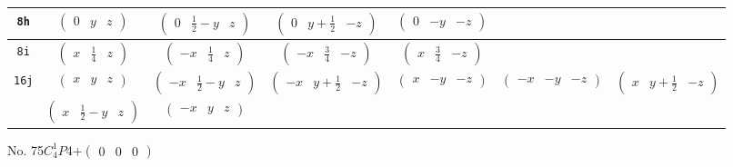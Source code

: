 \documentclass[fleqn,9pt,landscape]{jsarticle}
\begin{document}
\begin{center}
\begin{longtable}{ccccccc}
{\tt 8h} & $ \begin{pmatrix} 0 & y & z \end{pmatrix} $ & $ \begin{pmatrix} 0 & \frac{1}{2} - y & z \end{pmatrix} $ & $ \begin{pmatrix} 0 & y + \frac{1}{2} & - z \end{pmatrix} $ & $ \begin{pmatrix} 0 & - y & - z \end{pmatrix} $ & $  $ & $  $ \\ \hline
{\tt 8i} & $ \begin{pmatrix} x & \frac{1}{4} & z \end{pmatrix} $ & $ \begin{pmatrix} - x & \frac{1}{4} & z \end{pmatrix} $ & $ \begin{pmatrix} - x & \frac{3}{4} & - z \end{pmatrix} $ & $ \begin{pmatrix} x & \frac{3}{4} & - z \end{pmatrix} $ & $  $ & $  $ \\ \hline
{\tt 16j} & $ \begin{pmatrix} x & y & z \end{pmatrix} $ & $ \begin{pmatrix} - x & \frac{1}{2} - y & z \end{pmatrix} $ & $ \begin{pmatrix} - x & y + \frac{1}{2} & - z \end{pmatrix} $ & $ \begin{pmatrix} x & - y & - z \end{pmatrix} $ & $ \begin{pmatrix} - x & - y & - z \end{pmatrix} $ & $ \begin{pmatrix} x & y + \frac{1}{2} & - z \end{pmatrix} $ \\
& $ \begin{pmatrix} x & \frac{1}{2} - y & z \end{pmatrix} $ & $ \begin{pmatrix} - x & y & z \end{pmatrix} $ & $  $ & $  $ & $  $ & $  $ \\
\end{longtable}
\end{center}
\newpage
No. 75\quad$C_{4}^{1}$\quad$P4$\quad[ tetragonal ]\quad$+\begin{pmatrix} 0 & 0 & 0 \end{pmatrix}$
\end{document}
